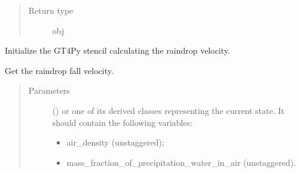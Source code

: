 \documentclass[letterpaper,10pt,english]{sphinxmanual}
\begin{document}
\begin{fulllineitems}
\begin{fulllineitems}
\begin{quote}
\begin{description}
\item[{Return type}] \leavevmode
obj

\end{description}\end{quote}

\end{fulllineitems}


\begin{fulllineitems}
\label{\detokenize{api:tasmania.parameterizations.adjustment_microphysics_kessler_wrf_saturation.AdjustmentMicrophysicsKesslerWRFSaturation._stencil_raindrop_fall_velocity_initialize}}
Initialize the GT4Py stencil calculating the raindrop velocity.

\end{fulllineitems}


\begin{fulllineitems}
\label{\detokenize{api:tasmania.parameterizations.adjustment_microphysics_kessler_wrf_saturation.AdjustmentMicrophysicsKesslerWRFSaturation.get_raindrop_fall_velocity}}
Get the raindrop fall velocity.
\begin{quote}\begin{description}
\item[{Parameters}] \leavevmode
{} () \textendash{} 
{\hyperref[\detokenize{api:tasmania.storages.grid_data.GridData}]{}} or one of its derived classes representing the current state.
It should contain the following variables:
\begin{itemize}
\item {} 
air\_density (unstaggered);

\item {} 
mass\_fraction\_of\_precipitation\_water\_in\_air (unstaggered).

\end{itemize}



\end{description}
\end{quote}
\end{fulllineitems}
\end{fulllineitems}
\end{document}
